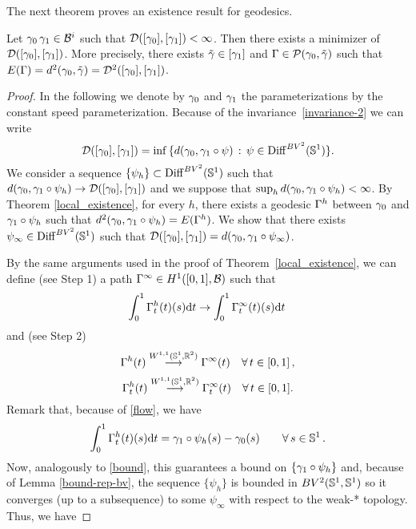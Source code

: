 The next theorem proves an existence result for geodesics.


\begin{thm}\label{localbv2}
Let $\gamma_0\, \gamma_1 \in \mathcal{B}^i$ such that $\mathcal{D}([\gamma_0] , [\gamma_1])<\infty$. Then there exists a minimizer  of $\mathcal{D}([\gamma_0] , [\gamma_1])$. More precisely, there exists $\tilde{\gamma} \in [\gamma_1]$ and $\Gamma\in \mathcal{P}(\gamma_0,\tilde{\gamma})$ such that $E(\Gamma)=d^2(\gamma_0,\tilde{\gamma}) = \mathcal{D}^2([\gamma_0] , [\gamma_1])$.	
\end{thm}

\begin{proof} In the following we denote by $\gamma_0$ and $\gamma_1$ the parameterizations by the constant speed parameterization.
Because of the invariance~\eqref{invariance-2} we can write 
$$\mathcal{D}([\gamma_0] , [\gamma_1]) = \inf\, \{ d(\gamma_0, \gamma_1 \circ \psi ) \,: \,\psi \in {\rm{Diff}}^{BV^2}(\mathbb{S}^1)\}.$$
We consider a sequence $\{\psi_h\} \subset {\rm{Diff}}^{BV^2}(\mathbb{S}^1)$ such that $ d(\gamma_0, \gamma_1 \circ \psi_h )\rightarrow \mathcal{D}([\gamma_0] , [\gamma_1])$ and we suppose that $\sup_h d(\gamma_0, \gamma_1 \circ \psi_h ) < \infty$.  By Theorem \ref{local_existence}, for every $h$, there exists a geodesic  $\Gamma^h$  between  $\gamma_0$ and $\gamma_1\circ \psi_h$  such that $d^2(\gamma_0, \gamma_1 \circ \psi_h ) =E(\Gamma^h)$. 
We show that there exists  $\psi_\infty \in {\rm{Diff}}^{BV^2}(\mathbb{S}^1)$ such that $ \mathcal{D}([\gamma_0] , [\gamma_1]) = d(\gamma_0, \gamma_1 \circ \psi_\infty)$. 
\par By the same arguments used in the proof of Theorem~\ref{local_existence}, we can define (see Step 1) a path $\Gamma^\infty\in H^1([0,1],\mathcal{B})$ such that 
\begin{equation}\label{convergence-path}\int_0^1 \Gamma^h_t(t)(s) \mathrm{d} t \rightarrow \int_0^1 \Gamma^\infty_t(t)(s) \mathrm{d} t\,\end{equation}
and (see Step 2)
\begin{equation}\label{convergence-path20}
\Gamma^h(t) \overset{W^{1,1}(\mathbb{S}^1,\mathbb{R}^2)}{\longrightarrow} \Gamma^\infty(t) \quad \forall\,t\in [0,1]\,,
\end{equation}
\begin{equation}\label{convergence-path2}
\Gamma^h_t(t) \overset{W^{1,1}(\mathbb{S}^1,\mathbb{R}^2)}{\longrightarrow} \Gamma^\infty_t(t) \quad \forall\,t\in [0,1].
\end{equation}
Remark that, because of \eqref{flow},  we have 
\begin{equation}\label{flow-path}
\int_0^1 \Gamma_t^h(t)(s)\mathrm{d} t = \gamma_1\circ \psi_h(s)-\gamma_0(s)\quad\quad  \forall \, s\in \mathbb{S}^1\,.
\end{equation}
Now, analogously to \eqref{bound}, this guarantees a bound on $\{\gamma_1\circ \psi_h\}$ and, because of Lemma \ref{bound-rep-bv}, the sequence $\{\psi_h\}$ is bounded in $BV^2(\mathbb{S}^1, \mathbb{S}^1)$ so it converges (up to a subsequence) to some $\psi_\infty$ with respect to the weak-* topology. Thus, we have  


\end{proof}
